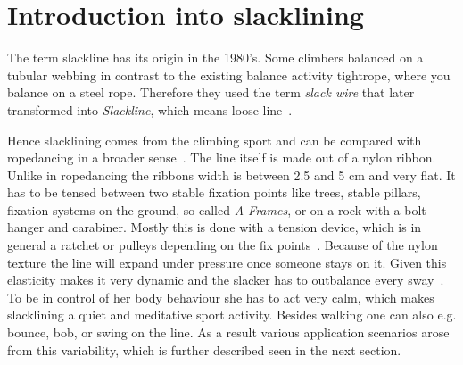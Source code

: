 \section{Introduction into slacklining}\label{3_1_introductionSlacklining}

The term slackline has its origin in the 1980's. Some climbers balanced on a tubular webbing in contrast to the existing balance activity tightrope, where you balance on a steel rope. Therefore they used the term \textit{slack wire} that later transformed into \textit{Slackline}, which means loose line~\cite{Zak2011-sl, Balcom2005-wl, MillerMauser2013-sl}.

Hence slacklining comes from the climbing sport and can be compared with ropedancing in a broader sense~\cite{Kleindl2011-bl}. The line itself is made out of a nylon ribbon. Unlike in ropedancing the ribbons width is between 2.5 and 5 cm and very flat. It has to be tensed between two stable fixation points like trees, stable pillars, fixation systems on the ground, so called \textit{A-Frames}, or on a rock with a bolt hanger and carabiner. Mostly this is done with a tension device, which is in general a ratchet or pulleys depending on the fix points~\cite{Kleindl2011-bl}. Because of the nylon texture the line will expand under pressure once someone stays on it. Given this elasticity makes it very dynamic and the slacker has to outbalance every sway~\cite{Kroiss2007-ab}. To be in control of her body behaviour she has to act very calm, which makes slacklining a quiet and meditative sport activity. Besides walking one can also e.g. bounce, bob, or swing on the line. As a result various application scenarios arose from this variability, which is further described seen in the next section.